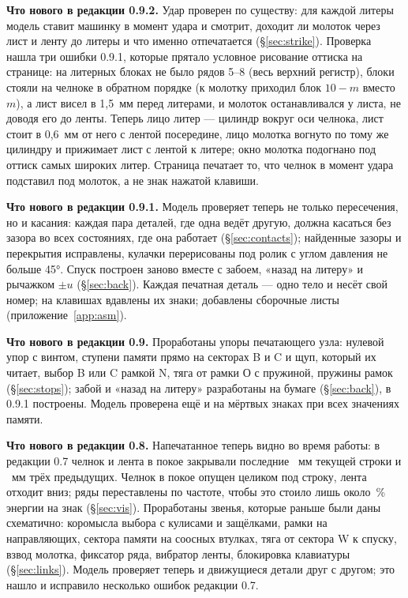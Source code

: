 {\textbf{Что нового в редакции 0.9.2.} Удар проверен по существу: для каждой литеры модель ставит машинку в момент удара и смотрит, доходит ли молоток через лист и ленту до литеры и что именно отпечатается (\S\ref{sec:strike}). Проверка нашла три ошибки 0.9.1, которые прятало условное рисование оттиска на странице: на литерных блоках не было рядов 5--8 (весь верхний регистр), блоки стояли на челноке в обратном порядке (к молотку приходил блок $10 - m$ вместо $m$), а лист висел в 1,5~мм перед литерами, и молоток останавливался у листа, не доводя его до ленты. Теперь лицо литер — цилиндр вокруг оси челнока, лист стоит в 0,6~мм от него с лентой посередине, лицо молотка вогнуто по тому же цилиндру и прижимает лист с лентой к литере; окно молотка подогнано под оттиск самых широких литер. Страница печатает то, что челнок в момент удара подставил под молоток, а не знак нажатой клавиши.

\textbf{Что нового в редакции 0.9.1.} Модель проверяет теперь не только пересечения, но и касания: каждая пара деталей, где одна ведёт другую, должна касаться без зазора во всех состояниях, где она работает (\S\ref{sec:contacts}); найденные зазоры и перекрытия исправлены, кулачки перерисованы под ролик с углом давления не больше 45°. Спуск построен заново вместе с забоем, «назад на литеру» и рычажком $\pm u$ (\S\ref{sec:back}). Каждая печатная деталь — одно тело и несёт свой номер; на клавишах вдавлены их знаки; добавлены сборочные листы (приложение~\ref{app:asm}).

\textbf{Что нового в редакции 0.9.} Проработаны упоры печатающего узла: нулевой упор с винтом, ступени памяти прямо на секторах B и C и щуп, который их читает, выбор B или C рамкой N, тяга от рамки О с пружиной, пружины рамок (\S\ref{sec:stops}); забой и «назад на литеру» разработаны на бумаге (\S\ref{sec:back}), в 0.9.1 построены. Модель проверена ещё и на мёртвых знаках при всех значениях памяти.

\textbf{Что нового в редакции 0.8.} Напечатанное теперь видно во время работы: в редакции 0.7 челнок и лента в покое закрывали последние \mvbefore~мм текущей строки и \mvbeforeold~мм трёх предыдущих. Челнок в покое опущен целиком под строку, лента отходит вниз; ряды переставлены по частоте, чтобы это стоило лишь около \mavgcost\,\% энергии на знак (\S\ref{sec:vis}). Проработаны звенья, которые раньше были даны схематично: коромысла выбора с кулисами и защёлками, рамки на направляющих, сектора памяти на соосных втулках, тяга от сектора W к спуску, взвод молотка, фиксатор ряда, вибратор ленты, блокировка клавиатуры (\S\ref{sec:links}). Модель проверяет теперь и движущиеся детали друг с другом; это нашло и исправило несколько ошибок редакции 0.7.\par}


